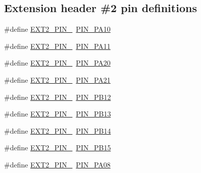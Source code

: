 \subsection*{Extension header \#2 pin definitions}
\begin{DoxyCompactItemize}
\item 
\#define \mbox{\hyperlink{group__samd21__xplained__pro__features__group_ga2aeb3f2ed8db08dc322578ab038f9956}{E\+X\+T2\+\_\+\+P\+I\+N\+\_}}~\mbox{\hyperlink{pio_2samd21j18a_8h_a8bdc2380ba42c8288b661ced1f678933}{P\+I\+N\+\_\+\+P\+A10}}
\item 
\#define \mbox{\hyperlink{group__samd21__xplained__pro__features__group_ga22572d5f0c2876377fe62f0a7c28195f}{E\+X\+T2\+\_\+\+P\+I\+N\+\_}}~\mbox{\hyperlink{pio_2samd21j18a_8h_a01f1322d5a1df159a79f1a9cdf4201d2}{P\+I\+N\+\_\+\+P\+A11}}
\item 
\#define \mbox{\hyperlink{group__samd21__xplained__pro__features__group_gaa52e8320e78bf06a8f93ea43b4f1b150}{E\+X\+T2\+\_\+\+P\+I\+N\+\_}}~\mbox{\hyperlink{pio_2samd21j18a_8h_a00c77a5c19a99cee2402fc83b04c02d5}{P\+I\+N\+\_\+\+P\+A20}}
\item 
\#define \mbox{\hyperlink{group__samd21__xplained__pro__features__group_gac3b50faec712d1e3f555eb501d4626f8}{E\+X\+T2\+\_\+\+P\+I\+N\+\_}}~\mbox{\hyperlink{pio_2samd21j18a_8h_af985624239bfbec119533432376256b8}{P\+I\+N\+\_\+\+P\+A21}}
\item 
\#define \mbox{\hyperlink{group__samd21__xplained__pro__features__group_ga992fafe0d99a8dcebb6f6c93b9f8dd8d}{E\+X\+T2\+\_\+\+P\+I\+N\+\_}}~\mbox{\hyperlink{pio_2samd21j18a_8h_a4c73054a65245b26b8d56438c269a5f8}{P\+I\+N\+\_\+\+P\+B12}}
\item 
\#define \mbox{\hyperlink{group__samd21__xplained__pro__features__group_gab7ec1f0caf30f1b99e5555fdc391733d}{E\+X\+T2\+\_\+\+P\+I\+N\+\_}}~\mbox{\hyperlink{pio_2samd21j18a_8h_aac822122271e05b08d918692cd81ebe9}{P\+I\+N\+\_\+\+P\+B13}}
\item 
\#define \mbox{\hyperlink{group__samd21__xplained__pro__features__group_ga4654d52b9352ac9e1cade0d2014e3a6b}{E\+X\+T2\+\_\+\+P\+I\+N\+\_}}~\mbox{\hyperlink{pio_2samd21j18a_8h_a886b07fd0b01a62c7236bfac719c0d85}{P\+I\+N\+\_\+\+P\+B14}}
\item 
\#define \mbox{\hyperlink{group__samd21__xplained__pro__features__group_gafdaa744e4c7e5c93e846a4f0ea9d0fbb}{E\+X\+T2\+\_\+\+P\+I\+N\+\_}}~\mbox{\hyperlink{pio_2samd21j18a_8h_a2dfe52fc70c0fa20c50efcb5260b7f6e}{P\+I\+N\+\_\+\+P\+B15}}
\item 
\#define \mbox{\hyperlink{group__samd21__xplained__pro__features__group_ga7508977dcf3c430814604914ceb0e6f7}{E\+X\+T2\+\_\+\+P\+I\+N\+\_}}~\mbox{\hyperlink{pio_2samd21j18a_8h_a7dc08bf81d9967156de18aae2cb5fe46}{P\+I\+N\+\_\+\+P\+A08}}

\end{DoxyCompactItemize}
